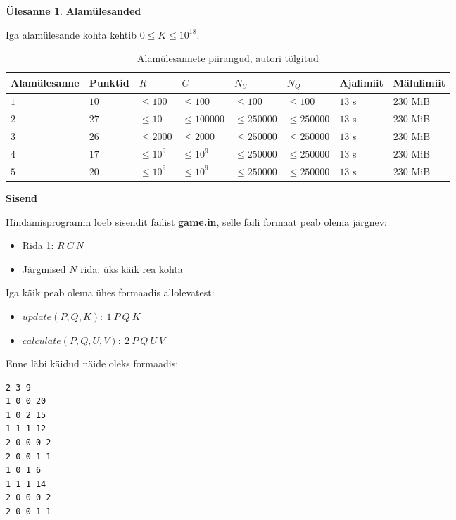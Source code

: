 \documentclass{trkut}
\theoremstyle{definition}
\newtheorem*{Text}{Ülesanne}
\begin{document}
\begin{Text}
\textbf{Alamülesanded}

Iga alamülesande kohta kehtib $0\le K\le 10^{18}$.

\begin{table}[H]
\caption{Alamülesannete piirangud, autori tõlgitud}%
\label{tabel1}%
\begin{tabular}{|l|l|l|l|l|l|l|l|}
\hline
Alamülesanne & Punktid & $R$        & $C$          & $N_U$        & $N_Q$        & Ajalimiit & Mälulimiit \\ \hline
$1$          & $10$    & $\le 100$  & $\le 100$    & $\le 100$    & $\le 100$    & $13$ s    & $230$ MiB  \\ \hline
$2$          & $27$    & $\le 10$   & $\le 100000$ & $\le 250000$ & $\le 250000$ & $13$ s    & $230$ MiB  \\ \hline
$3$          & $26$    & $\le 2000$ & $\le 2000$   & $\le 250000$ & $\le 250000$ & $13$ s    & $230$ MiB  \\ \hline
$4$          & $17$    & $\le 10^9$ & $\le 10^9$   & $\le 250000$ & $\le 250000$ & $13$ s    & $230$ MiB  \\ \hline
$5$          & $20$    & $\le 10^9$ & $\le 10^9$   & $\le 250000$ & $\le 250000$ & $13$ s    & $230$ MiB  \\ \hline
\end{tabular}
\end{table}

\textbf{Sisend}

Hindamisprogramm loeb sisendit failist \textbf{game.in}, selle faili formaat peab olema järgnev:
\begin{itemize}
    \item Rida 1: $R\ C\ N$
    \item Järgmised $N$ rida: üks käik rea kohta
\end{itemize}

Iga käik peab olema ühes formaadis allolevatest:
\begin{itemize}
    \item $update(P,Q,K):\ 1\ P\ Q\ K$
    \item $calculate(P,Q,U,V):\ 2\ P\ Q\ U\ V$
\end{itemize}

Enne läbi käidud näide oleks formaadis:
\begin{verbatim}
2 3 9
1 0 0 20
1 0 2 15
1 1 1 12
2 0 0 0 2
2 0 0 1 1
1 0 1 6
1 1 1 14
2 0 0 0 2
2 0 0 1 1
\end{verbatim}


\end{Text}
\end{document}
